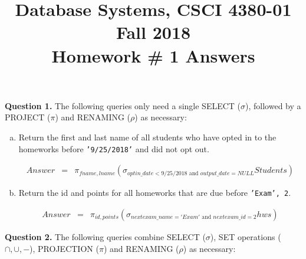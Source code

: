 \documentclass[11pt]{article}
\title{Database Systems, CSCI 4380-01 Fall 2018 \\
Homework \# 1 Answers}
\date{}
\begin{document}
\maketitle

\vspace*{-0.7in}

{\bf Question 1.} The following queries only need a single SELECT
($\sigma$), followed by a PROJECT ($\pi$) and RENAMING
($\rho$) as necessary:

\begin{enumerate}  [(a)]
\item Return the first and last name of all students who have opted in
  to the homeworks before {\tt '9/25/2018'} and did not opt out.

\begin{eqnarray*}
Answer & = & \pi_{fname, lname} (\sigma_{optin\_date<9/25/2018 \mbox{ and } output\_date = NULL} Students)
\end{eqnarray*}

\item Return the id and points for all homeworks that are due before
  {\tt 'Exam', 2}.

\begin{eqnarray*}
Answer & = & \pi_{id, points} (\sigma_{nextexam\_name = 'Exam'  \mbox{ and } nextexam\_id = 2} hws)
\end{eqnarray*}
  
\end{enumerate}

\newpage

{\bf Question 2.} The following queries combine SELECT ($\sigma$), SET
operations ($\cap,\cup,-$), PROJECTION ($\pi$) and RENAMING
($\rho$) as necessary:
\end{document}
